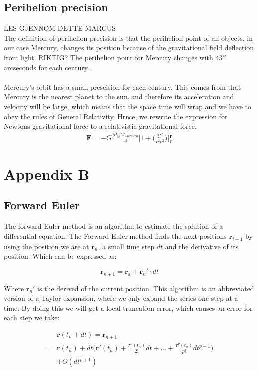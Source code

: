 \documentclass{article}
\begin{document}
\subsection{Perihelion precision}
LES GJENNOM DETTE MARCUS\\
The definition of perihelion precision is that the perihelion point of an objects, in our case Mercury, changes its position because of 
the gravitational field deflection from light. RIKTIG? The perihelion point for Mercury changes with $43''$ arcseconds for each century. \\
\\
Mercury's orbit has a small prescision for each century. This comes from that Mercury is the nearest planet to the sun, and therefore its acceleration and velocity will be large, which means that the space time will wrap    and we have to obey the rules of General Relativity. Hrnce, we rewrite the expression for Newtons gravitational force to a relativistic gravitational force.
\begin{align}
    \mathbf{F}=-G\frac{M_{\odot}M_{Mercury}}{r^2}\Bigg[1+\Bigg(\frac{3l^2}{r^2c^2}\bigg)\bigg]\frac{\mathbf{r}}{r}
\end{align}

\section{Appendix B} %
\subsection{Forward Euler}
The forward Euler method is an algorithm to estimate the solution of a differential equation. The Forward Euler method  finds the next positions $\mathbf{r}_{i+1}$ by using the position we are at $\mathbf{r}_{n}$, a small time step $dt$ and the derivative of its position. Which can be expressed as:

\begin{equation}
\mathbf{r}_{n+1}=\mathbf{r}_n + \mathbf{r}_n'\cdot dt
\label{eq:yn1}
\end{equation}

Where $\mathbf{r}_n'$ is the derived of the current position. This algorithm is an abbreviated version of a Taylor expansion, where we only expand the series one step at a time. By doing this we will get a local truncation error, which causes an error for each step we take:

\begin{equation}
\begin{split}
&\mathbf{r}(t_n+dt)=\mathbf{r}_{n+1}\\
=&\mathbf{r}(t_n)+dt\bigg(\mathbf{r}'(t_n) + \frac{\mathbf{r}''(t_n)}{2!}dt + ... + \frac{\mathbf{r}^p(t_n)}{p!}dt^{p-1}\bigg) \\
&+ O(dt^{p+1})
\end{split}
\label{eq:ytndt}
\end{equation} 
\end{document}
